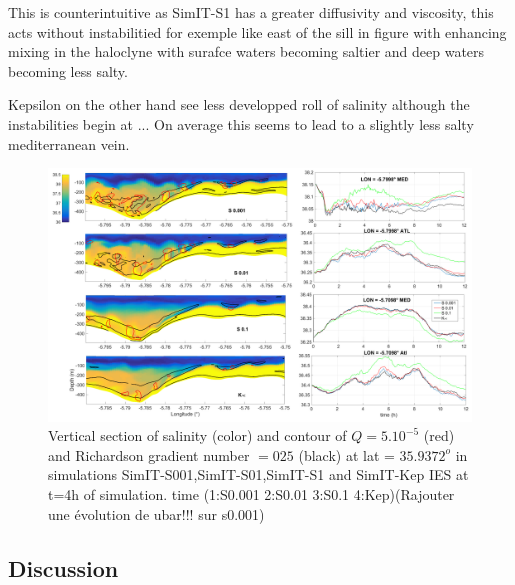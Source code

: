 
This is counterintuitive as SimIT-S1 has a greater diffusivity and viscosity, this acts without instabilitied for exemple like east of the sill in figure with enhancing mixing in the haloclyne with surafce waters becoming saltier and deep waters becoming less salty.

Kepsilon on the other hand see less developped roll of salinity although the instabilities begin at ... On average this seems to lead to a slightly less salty mediterranean vein.



\begin{figure}[!h]
 \includegraphics[width=\textwidth]{./GBR3D/Figsmago.png}
 \caption {Vertical section of salinity (color) and contour of $Q=5.10^{-5}$ (red) and Richardson gradient number $=025$ (black) at lat = $35.9372^o$ in simulations SimIT-S001,SimIT-S01,SimIT-S1 and SimIT-Kep IES at t=4h of simulation. time  (1:S0.001  2:S0.01  3:S0.1 4:Kep)(Rajouter une évolution de ubar!!! sur s0.001)}
 \label{Fig3Dsch}
\end{figure}

\subsection{Discussion}

